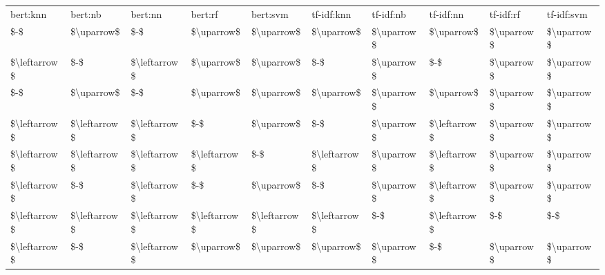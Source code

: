 \begin{tabular}{llllllllll}
\toprule
    bert:knn &      bert:nb &      bert:nn &      bert:rf &     bert:svm &   tf-idf:knn &  tf-idf:nb &    tf-idf:nn &  tf-idf:rf &   tf-idf:svm \\
         \$-\$ &   \$\textbackslash uparrow\$ &          \$-\$ &   \$\textbackslash uparrow\$ &   \$\textbackslash uparrow\$ &   \$\textbackslash uparrow\$ & \$\textbackslash uparrow\$ &   \$\textbackslash uparrow\$ & \$\textbackslash uparrow\$ &   \$\textbackslash uparrow\$ \\
\midrule
\$\textbackslash leftarrow\$ &          \$-\$ & \$\textbackslash leftarrow\$ &   \$\textbackslash uparrow\$ &   \$\textbackslash uparrow\$ &          \$-\$ & \$\textbackslash uparrow\$ &          \$-\$ & \$\textbackslash uparrow\$ &   \$\textbackslash uparrow\$ \\
         \$-\$ &   \$\textbackslash uparrow\$ &          \$-\$ &   \$\textbackslash uparrow\$ &   \$\textbackslash uparrow\$ &   \$\textbackslash uparrow\$ & \$\textbackslash uparrow\$ &   \$\textbackslash uparrow\$ & \$\textbackslash uparrow\$ &   \$\textbackslash uparrow\$ \\
\$\textbackslash leftarrow\$ & \$\textbackslash leftarrow\$ & \$\textbackslash leftarrow\$ &          \$-\$ &   \$\textbackslash uparrow\$ &          \$-\$ & \$\textbackslash uparrow\$ & \$\textbackslash leftarrow\$ & \$\textbackslash uparrow\$ &   \$\textbackslash uparrow\$ \\
\$\textbackslash leftarrow\$ & \$\textbackslash leftarrow\$ & \$\textbackslash leftarrow\$ & \$\textbackslash leftarrow\$ &          \$-\$ & \$\textbackslash leftarrow\$ & \$\textbackslash uparrow\$ & \$\textbackslash leftarrow\$ & \$\textbackslash uparrow\$ &   \$\textbackslash uparrow\$ \\
\$\textbackslash leftarrow\$ &          \$-\$ & \$\textbackslash leftarrow\$ &          \$-\$ &   \$\textbackslash uparrow\$ &          \$-\$ & \$\textbackslash uparrow\$ & \$\textbackslash leftarrow\$ & \$\textbackslash uparrow\$ &   \$\textbackslash uparrow\$ \\
\$\textbackslash leftarrow\$ & \$\textbackslash leftarrow\$ & \$\textbackslash leftarrow\$ & \$\textbackslash leftarrow\$ & \$\textbackslash leftarrow\$ & \$\textbackslash leftarrow\$ &        \$-\$ & \$\textbackslash leftarrow\$ &        \$-\$ &          \$-\$ \\
\$\textbackslash leftarrow\$ &          \$-\$ & \$\textbackslash leftarrow\$ &   \$\textbackslash uparrow\$ &   \$\textbackslash uparrow\$ &   \$\textbackslash uparrow\$ & \$\textbackslash uparrow\$ &          \$-\$ & \$\textbackslash uparrow\$ &   \$\textbackslash uparrow\$ \\

\end{tabular}
